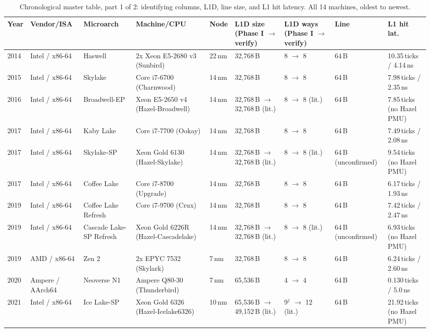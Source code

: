 \documentclass{article}
\newcommand{\cmark}{\ding{51}}
\newcommand{\xmark}{\ding{55}}
\begin{document}
\begin{table}[H]
\centering
{\tiny\setlength{\tabcolsep}{3pt}
\caption{Chronological master table, part 1 of 2: identifying columns, L1D, line size, and L1 hit latency. All 14 machines, oldest to newest.}
\label{tab:master-full-l1}
\begin{tabularx}{\textwidth}{|l|X|X|X|l|X|X|X|X|}
\hline
Year & Vendor/ISA & Microarch & Machine/CPU & Node & L1D size (Phase I $\to$ verify) & L1D ways (Phase I $\to$ verify) & Line & L1 hit lat.\\
\hline
2014 & Intel / x86-64 & Haswell & 2x Xeon E5-2680 v3 (Sunbird) & 22\,nm & 32,768\,B & 8 $\to$ 8 \cmark & 64\,B & 10.35\,ticks / 4.14\,ns\\
2015 & Intel / x86-64 & Skylake & Core i7-6700 (Charnwood) & 14\,nm & 32,768\,B & 8 $\to$ 8 \cmark & 64\,B & 7.98\,ticks / 2.35\,ns\\
2016 & Intel / x86-64 & Broadwell-EP & Xeon E5-2650 v4 (Hazel-Broadwell) & 14\,nm & 32,768\,B $\to$ 32,768\,B (lit.) \cmark & 8 $\to$ 8 (lit.) \cmark & 64\,B & 7.85\,ticks (no Hazel PMU)\\
2017 & Intel / x86-64 & Kaby Lake & Core i7-7700 (Ookay) & 14\,nm & 32,768\,B & 8 $\to$ 8 \cmark & 64\,B & 7.49\,ticks / 2.08\,ns\\
2017 & Intel / x86-64 & Skylake-SP & Xeon Gold 6130 (Hazel-Skylake) & 14\,nm & 32,768\,B $\to$ 32,768\,B (lit.) \cmark & 8 $\to$ 8 (lit.) \cmark & 64\,B (unconfirmed) & 9.54\,ticks (no Hazel PMU)\\
2017 & Intel / x86-64 & Coffee Lake & Core i7-8700 (Upgrade) & 14\,nm & 32,768\,B & 8 $\to$ 8 \cmark & 64\,B & 6.17\,ticks / 1.93\,ns\\
2019 & Intel / x86-64 & Coffee Lake Refresh & Core i7-9700 (Crux) & 14\,nm & 32,768\,B & 8 $\to$ 8 \cmark & 64\,B & 7.42\,ticks / 2.47\,ns\\
2019 & Intel / x86-64 & Cascade Lake-SP Refresh & Xeon Gold 6226R (Hazel-Cascadelake) & 14\,nm & 32,768\,B $\to$ 32,768\,B (lit.) \cmark & 8 $\to$ 8 (lit.) \cmark & 64\,B (unconfirmed) & 6.93\,ticks (no Hazel PMU)\\
2019 & AMD / x86-64 & Zen 2 & 2x EPYC 7532 (Skylark) & 7\,nm & 32,768\,B & 8 $\to$ 8 \cmark & 64\,B & 6.24\,ticks / 2.60\,ns\\
2020 & Ampere / AArch64 & Neoverse N1 & Ampere Q80-30 (Thunderbird) & 7\,nm & 65,536\,B & 4 $\to$ 4 \cmark & 64\,B & 0.130\,ticks / 5.0\,ns\\
2021 & Intel / x86-64 & Ice Lake-SP & Xeon Gold 6326 (Hazel-Icelake6326) & 10\,nm & 65,536\,B $\to$ 49,152\,B (lit.) \xmark & 9$^\dagger$ $\to$ 12 (lit.) & 64\,B & 21.92\,ticks (no Hazel PMU)\\

\end{tabularx}}
\end{table}
\end{document}
